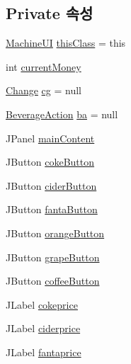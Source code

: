 \subsection*{Private 속성}
\begin{DoxyCompactItemize}
\item 
\hyperlink{class_vending_machine_1_1_machine_u_i}{Machine\+UI} \hyperlink{class_vending_machine_1_1_machine_u_i_a0d705e137d12427a9af68595eb2be582}{this\+Class} = this
\item 
int \hyperlink{class_vending_machine_1_1_machine_u_i_ab9b12975e6462529e3abda75e7ebf272}{current\+Money}
\item 
\hyperlink{class_vending_machine_1_1_change}{Change} \hyperlink{class_vending_machine_1_1_machine_u_i_a3aacb919b7c540d71bb398666f03dc08}{cg} = null
\item 
\hyperlink{class_vending_machine_1_1_beverage_action}{Beverage\+Action} \hyperlink{class_vending_machine_1_1_machine_u_i_ad8c40fda136d40c4b94b3ba22588bebf}{ba} = null
\item 
J\+Panel \hyperlink{class_vending_machine_1_1_machine_u_i_a2a9d8b6482b348ca6efb5ff6973e3a3b}{main\+Content}
\item 
J\+Button \hyperlink{class_vending_machine_1_1_machine_u_i_a2c0d9b4f7a1068c8073f20c4bf767fa4}{coke\+Button}
\item 
J\+Button \hyperlink{class_vending_machine_1_1_machine_u_i_a1e0af12bb99a608674652aa9b19b5c1a}{cider\+Button}
\item 
J\+Button \hyperlink{class_vending_machine_1_1_machine_u_i_a93b9aa7f2c2b9869072c6f47e33466bc}{fanta\+Button}
\item 
J\+Button \hyperlink{class_vending_machine_1_1_machine_u_i_ab42b9c2a41e85ceda94fd22154b6b5ee}{orange\+Button}
\item 
J\+Button \hyperlink{class_vending_machine_1_1_machine_u_i_a246588e3d736e1369da26163cf6b32d2}{grape\+Button}
\item 
J\+Button \hyperlink{class_vending_machine_1_1_machine_u_i_acf9d7af6407e22aaa5e8d08e2ea2e07e}{coffee\+Button}
\item 
J\+Label \hyperlink{class_vending_machine_1_1_machine_u_i_ae1d7f596ae4cbfd2803924f4a63a9c70}{cokeprice}
\item 
J\+Label \hyperlink{class_vending_machine_1_1_machine_u_i_a2e27dccbce68830250c1191a52c386a1}{ciderprice}
\item 
J\+Label \hyperlink{class_vending_machine_1_1_machine_u_i_aa7ed131451f7a3a4879834c240d51b38}{fantaprice}
\item 

\end{DoxyCompactItemize}
